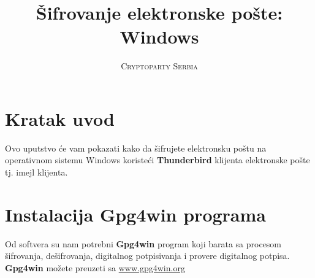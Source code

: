 \documentclass[a4paper,11pt]{article}
\title{\Huge \textbf{\v{S}ifrovanje elektronske po\v{s}te: Windows}}
\author{\textsc{Cryptoparty Serbia}}
\begin{document}
\maketitle
\tableofcontents

\newpage
\section{Kratak uvod}
Ovo uputstvo \'{c}e vam pokazati kako da \v{s}ifrujete elektronsku po\v{s}tu na operativnom sistemu Windows koriste\'{c}i \textbf{Thunderbird} klijenta elektronske po\v{s}te tj. imejl klijenta.

\section{Instalacija Gpg4win programa}
Od softvera su nam potrebni \textbf{Gpg4win} program koji barata sa procesom \v{s}ifrovanja, de\v{s}ifrovanja, digitalnog potpisivanja i provere digitalnog potpisa.
\newline \textbf{Gpg4win} mo\v{z}ete preuzeti sa \href{http://www.gpg4win.org}{www.gpg4win.org}
\end{document}

